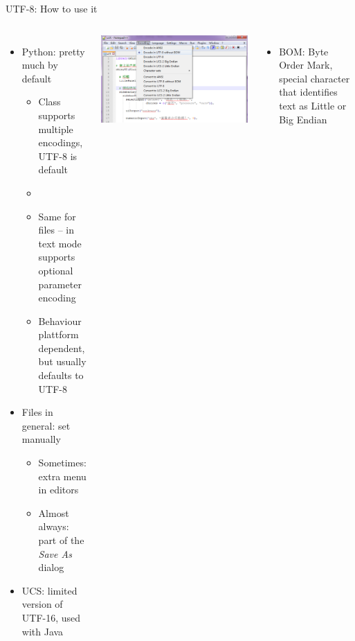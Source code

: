 
\begin{frame}[fragile]{UTF-8: How to use it}
%
\begin{columns}
\begin{itemize}
\item Python: pretty much by default
	\begin{itemize}
	\item Class  supports multiple encodings, UTF-8 is default
	\item {}
	\item Same for files --  in text mode supports optional parameter encoding
	\item Behaviour plattform dependent, but usually defaults to UTF-8
	\end{itemize}
\item Files in general: set manually
	\begin{itemize}
	\item Sometimes: extra menu in editors
	\item Almost always: part of the \emph{Save As} dialog
	\end{itemize}
\item UCS: limited version of UTF-16, used with Java
\end{itemize}
%
\includegraphics[width=\linewidth]{./gfx/notepad-plus-utf8.png}

\begin{itemize}
\item BOM: Byte Order Mark, special character that identifies text as Little or Big Endian
\end{itemize}
\end{columns}
%
\end{frame}

